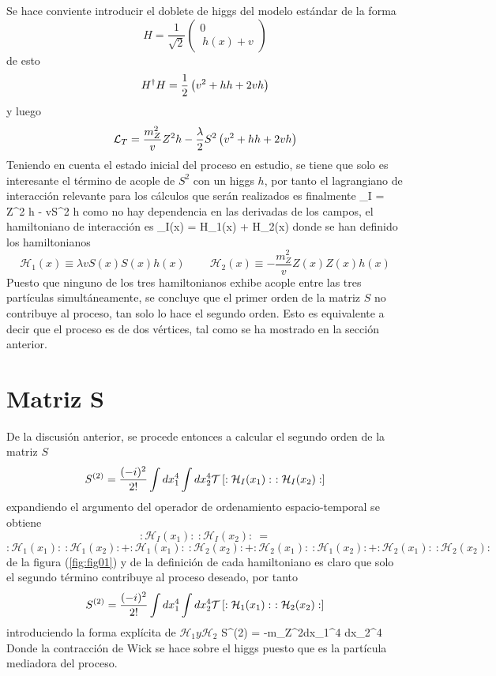 Se hace conviente introducir el doblete de higgs del modelo estándar de la forma
\[ H = \frac{1}{\sqrt 2}
\begin{pmatrix}
  0 \\\ h(x) + v
\end{pmatrix} \]
de esto
\[ H^\dag H = \frac{1}{2}\left(  v^2 + hh + 2vh  \right) \]
y luego
\[ \mathcal{L}_{T} = \frac{m_Z^2}{v} Z^2 h - \frac{\lambda }{2}S^2\left(  v^2 + hh + 2vh  \right)  \]
Teniendo en cuenta el estado inicial del proceso en estudio, se tiene que solo es interesante el término de acople de $S^2$ con un higgs $h$, por tanto el lagrangiano de interacción relevante para los cálculos que serán realizados es finalmente
{ _{I} =  Z^2 h - \lambda vS^2 h  }
como no hay dependencia en las derivadas de los campos, el hamiltoniano de interacción es
{ _{I}(x) = \mathcal H_1(x) + \mathcal H_2(x) }
donde se han definido los hamiltonianos
\[ \mathcal H_1(x) \equiv \lambda vS(x)S(x) h(x) \ \ \ \ \ \ \ \ \ \ \mathcal H_2(x) \equiv -\frac{m_Z^2}{v} Z(x)Z(x) h(x)   \]
Puesto que ninguno de los tres hamiltonianos exhibe acople entre las tres partículas simultáneamente, se concluye que el primer orden de la matriz $S$ no contribuye al proceso, tan solo lo hace el segundo orden. Esto es equivalente a decir que el proceso es de dos vértices, tal como se ha mostrado en la sección anterior.

\section{Matriz S}
De la discusión anterior, se procede entonces a calcular el segundo orden de la matriz $S$
\[ S^{(2)} = \frac{(-i)^2}{2!}\int dx_1^4 \int dx_2^4 \mathcal{T}\left[  :\mathcal H_I(x_1):\ :\mathcal H_I(x_2):  \right] \]
expandiendo el argumento del operador de ordenamiento espacio-temporal se obtiene
\[ :\mathcal H_I(x_1):\ :\mathcal H_I (x_2): \ = \]
\[:\mathcal H_1 (x_1):\ :\mathcal H_1 (x_2): + :\mathcal H_1 (x_1):\ :\mathcal H_2 (x_2): + :\mathcal H_2 (x_1):\ :\mathcal H_1(x_2): + :\mathcal H_2 (x_1):\ :\mathcal H_2 (x_2): \]
de la figura (\ref{fig:fig01}) y de la definición de cada hamiltoniano es claro que solo el segundo término contribuye al proceso deseado, por tanto
\[S^{(2)} = \frac{(-i)^2}{2!}\int dx_1^4 \int dx_2^4 \mathcal{T}\left[  :\mathcal H_1(x_1):\ :\mathcal H_2(x_2):  \right] \]
introduciendo la forma explícita de $\mathcal H_1 y \mathcal H_2$
{ \bcontraction{S^{(2)} = -\frac{(-i)^2}{2!}\lambda m_Z^2\int dx_1^4 \int dx_2^4 \mathcal{T}[:[S^2\ }{h}{](x_1):\ :[Z^2}{h}
S^{(2)} = -\lambda m_Z^2\int dx_1^4 \int dx_2^4  }
Donde la contracción de Wick se hace sobre el higgs puesto que es la partícula mediadora del proceso.

